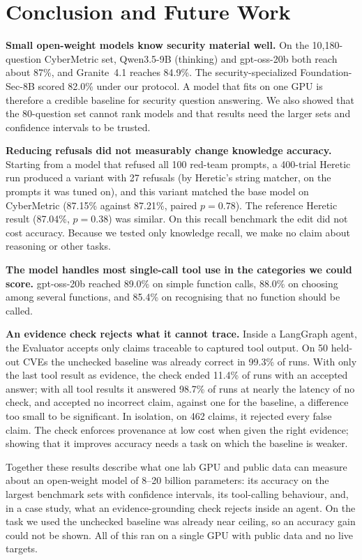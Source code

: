 \documentclass[conference]{IEEEtran}
\begin{document}
\section{Conclusion and Future Work}
\label{sec:conclusion}

\textbf{Small open-weight models know security material well.} On the
10{,}180-question CyberMetric set, Qwen3.5-9B (thinking) and gpt-oss-20b
both reach about 87\%, and Granite~4.1 reaches 84.9\%. The security-specialized
Foundation-Sec-8B scored 82.0\% under our protocol. A model that fits on one
GPU is therefore a credible baseline for security question answering. We also
showed that the 80-question set cannot rank models and that results need
the larger sets and confidence intervals to be trusted.

\textbf{Reducing refusals did not measurably change knowledge accuracy.}
Starting from a model that refused all 100 red-team prompts, a 400-trial
Heretic run produced a variant with 27 refusals (by Heretic's string
matcher, on the prompts it was tuned on), and this variant matched the
base model on CyberMetric (87.15\% against 87.21\%, paired $p=0.78$). The
reference Heretic result (87.04\%, $p=0.38$) was similar. On this recall benchmark
the edit did not cost accuracy. Because we tested only knowledge recall,
we make no claim about reasoning or other tasks.

\textbf{The model handles most single-call tool use in the categories we
could score.}
gpt-oss-20b reached 89.0\% on simple function calls, 88.0\% on choosing
among several functions, and 85.4\% on recognising that no function should
be called.

\textbf{An evidence check rejects what it cannot trace.} Inside a LangGraph
agent, the Evaluator accepts only claims traceable to captured tool output. On
50 held-out CVEs the unchecked baseline was already correct in 99.3\% of runs.
With only the last tool result as evidence, the check ended 11.4\% of runs with
an accepted answer; with all tool results it answered 98.7\% of runs at nearly
the latency of no check, and accepted no incorrect claim, against one for the
baseline, a difference too small to be significant. In isolation, on 462 claims,
it rejected every false claim. The check enforces provenance at low cost when
given the right evidence; showing that it improves accuracy needs a task on
which the baseline is weaker.

Together these results describe what one lab GPU and public data can
measure about an open-weight model of 8--20 billion parameters: its
accuracy on the largest benchmark sets with confidence intervals, its
tool-calling behaviour, and, in a case study, what an evidence-grounding
check rejects inside an agent. On the task we used the unchecked baseline
was already near ceiling, so an accuracy gain could not be shown. All of this
ran on a single GPU with public data and no live targets.
\end{document}
